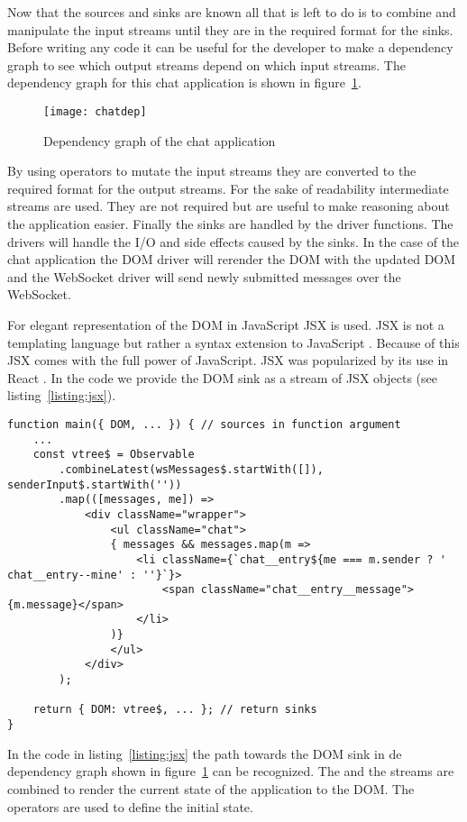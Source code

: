 Now that the sources and sinks are known all that is left to do is to combine and manipulate the input streams until they are in the required format for the sinks. Before writing any code it can be useful for the developer to make a dependency graph to see which output streams depend on which input streams. The dependency graph for this chat application is shown in figure~\ref{figure:chat-dep}.

\begin{figure}[H]
	\centering
	\texttt{[image: chatdep]}
	\caption{Dependency graph of the chat application}
	\label{figure:chat-dep}
\end{figure}

By using operators to mutate the input streams they are converted to the required format for the output streams. For the sake of readability intermediate streams are used. They are not required but are useful to make reasoning about the application easier. Finally the sinks are handled by the driver functions. The drivers will handle the I/O and side effects caused by the sinks. In the case of the chat application the DOM driver will rerender the DOM with the updated DOM and the WebSocket driver will send newly submitted messages over the WebSocket.

For elegant representation of the DOM in JavaScript JSX is used. JSX is not a templating language but rather a syntax extension to JavaScript \cite{jsx}. Because of this JSX comes with the full power of JavaScript. JSX was popularized by its use in React \cite{jsx}. In the code we provide the DOM sink as a stream of JSX objects (see listing~\ref{listing:jsx}).

\begin{lstlisting}[caption=Using JSX to define the DOM,label=listing:jsx]
function main({ DOM, ... }) { // sources in function argument
	...
	const vtree$ = Observable
		.combineLatest(wsMessages$.startWith([]), senderInput$.startWith(''))
		.map(([messages, me]) =>
			<div className="wrapper">
				<ul className="chat">
				{ messages && messages.map(m =>
					<li className={`chat__entry${me === m.sender ? ' chat__entry--mine' : ''}`}>
						<span className="chat__entry__message">{m.message}</span>
					</li>
				)}
				</ul>
			</div>
		);
		
	return { DOM: vtree$, ... }; // return sinks
}
\end{lstlisting}

In the code in listing~\ref{listing:jsx} the path towards the DOM sink in de dependency graph shown in figure~\ref{figure:chat-dep} can be recognized. The  and the  streams are combined to render the current state of the application to the DOM. The  operators are used to define the initial state.

